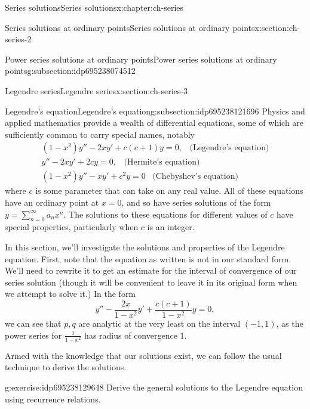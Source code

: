 \documentclass[oneside,10pt,]{book}
\numberwithin{equation}{section}
\numberwithin{equation}{section}
\newcommand{\ps}{\displaystyle \sum_{n=0}^\infty a_n x^n}
\begin{document}
\begin{chapterptx}{Series solutions}{}{Series solutions}{}{}{x:chapter:ch-series}
\begin{sectionptx}{Series solutions at ordinary points}{}{Series solutions at ordinary points}{}{}{x:section:ch-series-2}
\begin{subsectionptx}{Power series solutions at ordinary points}{}{Power series solutions at ordinary points}{}{}{g:subsection:idp695238074512}
\end{subsectionptx}
\end{sectionptx}
%
%
\typeout{************************************************}
\typeout{************************************************}
%
\begin{sectionptx}{Legendre series}{}{Legendre series}{}{}{x:section:ch-series-3}
%
%
\typeout{************************************************}
\typeout{************************************************}
%
\begin{subsectionptx}{Legendre's equation}{}{Legendre's equation}{}{}{g:subsection:idp695238121696}
Physics and applied mathematics provide a wealth of differential equations, some of which are sufficiently common to carry special names, notably%
\begin{gather*}
(1 - x^2)y'' - 2x y' + c(c + 1)y = 0, \,\,\, \text{ (Legendre's equation)}\\
y'' - 2xy' + 2cy = 0, \,\,\, \text{ (Hermite's equation)}\\
(1 - x^2) y'' - xy' + c^2 y = 0 \,\,\, \text{ (Chebyshev's equation)}
\end{gather*}
where \(c\) is some parameter that can take on any real value. All of these equations have an ordinary point at \(x = 0\), and so have series solutions of the form \(y = \ps\). The solutions to these equations for different values of \(c\) have special properties, particularly when \(c\) is an integer.%
\par
In this section, we'll investigate the solutions and properties of the Legendre equation. First, note that the equation as written is not in our standard form. We'll need to rewrite it to get an estimate for the interval of convergence of our series solution (though it will be convenient to leave it in its original form when we attempt to solve it.) In the form%
\begin{equation*}
y'' - \frac{2x}{1 - x^2} y' + \frac{c(c+1)}{1 - x^2} y = 0,
\end{equation*}
we can see that \(p, q\) are analytic at the very least on the interval \((-1,1)\), as the power series for \(\frac{1}{1- x^2}\) has radius of convergence \(1\).%
\par
Armed with the knowledge that our solutions exist, we can follow the usual technique to derive the solutions.%
\begin{inlineexercise}{}{g:exercise:idp695238129648}%
Derive the general solutions to the Legendre equation using recurrence relations.%

\end{inlineexercise}
\end{subsectionptx}
\end{sectionptx}
\end{chapterptx}
\end{document}
